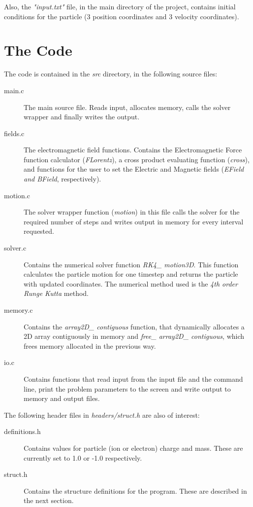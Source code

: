 \documentclass[11pt]{report}
\begin{document}
Also, the \emph{"input.txt"} file, in the main directory of the project, contains initial conditions for the particle (3 position coordinates and 3 velocity coordinates).

\section{The Code}
The code is contained in the \emph{src} directory, in the following source files:

\begin{description}
\item[main.c] The main source file. Reads input, allocates memory, calls the solver wrapper and finally writes the output.
\item[fields.c] The electromagnetic field functions. Contains the Electromagnetic Force function calculator (\emph{FLorentz}), a cross product evaluating function (\emph{cross}), and functions for the user to set the Electric and Magnetic fields (\emph{EField and BField}, respectively).
\item[motion.c] The solver wrapper function (\emph{motion}) in this file calls the solver for the required number of steps and writes output in memory for every interval requested.
\item[solver.c] Contains the numerical solver function \emph{RK4\_ motion3D}. This function calculates the particle motion for one timestep and returns the particle with updated coordinates. The numerical method used is the \emph{4th order Runge Kutta} method.
\item[memory.c] Contains the \emph{array2D\_ contiguous} function, that dynamically allocates a 2D array contiguously in memory and \emph{free\_ array2D\_ contiguous}, which frees memory allocated in the previous way.
\item[io.c] Contains functions that read input from the input file and the command line, print the problem parameters to the screen and write output to memory and output files.
\end{description}

The following header files in \emph{headers/struct.h} are also of interest:
\begin{description}
\item[definitions.h] Contains values for particle (ion or electron) charge and mass. These are currently set to 1.0 or -1.0 respectively.
\item[struct.h] Contains the structure definitions for the program. These are described in the next section.
\end{description}
\newpage
\end{document}
